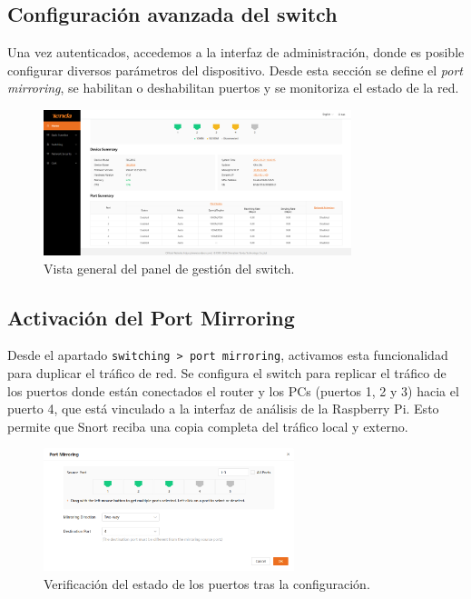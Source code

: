\documentclass[12pt,a4paper]{report}
\begin{document}
\subsection*{Configuración avanzada del switch}

Una vez autenticados, accedemos a la interfaz de administración, donde es posible configurar diversos parámetros del dispositivo. Desde esta sección se define el \textit{port mirroring}, se habilitan o deshabilitan puertos y se monitoriza el estado de la red.

\begin{figure}[H]
	\centering
	\includegraphics[width=0.8\textwidth]{pruebas_config/7-pagina_tenda.png}
	\caption{Vista general del panel de gestión del switch.}
\end{figure}

\pagebreak

\subsection*{Activación del Port Mirroring}

Desde el apartado \texttt{switching > port mirroring}, activamos esta funcionalidad para duplicar el tráfico de red. Se configura el switch para replicar el tráfico de los puertos donde están conectados el router y los PCs (puertos 1, 2 y 3) hacia el puerto 4, que está vinculado a la interfaz de análisis de la Raspberry Pi. Esto permite que Snort reciba una copia completa del tráfico local y externo.

\begin{figure}[H]
	\centering
	\includegraphics[width=0.65\textwidth]{pruebas_config/9-asignacion_port.png}
	\caption{Verificación del estado de los puertos tras la configuración.}
\end{figure}
\end{document}
